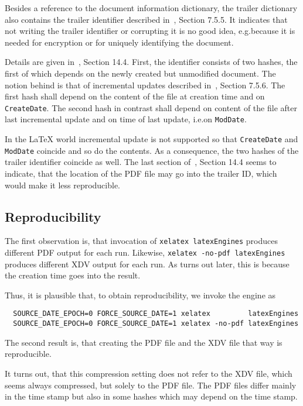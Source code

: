 \documentclass[a4paper, english]{article}%
\begin{document}
Besides a reference to the document information dictionary, 
the trailer dictionary also contains the trailer identifier 
described in~\cite{Pdf20}, Section 7.5.5. 
It indicates that not writing the trailer identifier or corrupting it is no good idea, 
e.g.\@ because it is needed for encryption or for uniquely identifying the document. 

Details are given in~\cite{Pdf20}, Section 14.4. 
First, the identifier consists of two hashes, 
the first of which depends on the newly created but unmodified document. 
The notion behind is that of incremental updates described in~\cite{Pdf20}, Section 7.5.6. 
The first hash shall depend on the content of the file 
at creation time and on \texttt{CreateDate}. 
The second hash in contrast shall depend on content of the file after last incremental update 
and on time of last update, i.e.\@ on \texttt{ModDate}. 

In the \LaTeX{} world incremental update is not supported 
so that \texttt{CreateDate} and \texttt{ModDate} coincide 
and so do the contents. 
As a consequence, the two hashes of the trailer identifier coincide as well. 
The last section of~\cite{Pdf20}, Section 14.4 seems to indicate, 
that the location of the PDF file may go into the trailer ID, 
which would make it less reproducible. 


\subsection{Reproducibility}\label{subsec:reprod}

The first observation is, that invocation of \texttt{xelatex latexEngines} 
produces different PDF output for each run. 
Likewise, \texttt{xelatex -no-pdf latexEngines} produces different XDV output for each run. 
As turns out later, this is because the creation time goes into the result. 

Thus, it is plausible that, to obtain reproducibility, we invoke the engine as 
%
\begin{verbatim}
  SOURCE_DATE_EPOCH=0 FORCE_SOURCE_DATE=1 xelatex         latexEngines
  SOURCE_DATE_EPOCH=0 FORCE_SOURCE_DATE=1 xelatex -no-pdf latexEngines
\end{verbatim}

The second result is, that creating the PDF file and the XDV file that way is reproducible. 




It turns out, that this compression setting does not refer to the XDV file, 
which seems always compressed, but solely to the PDF file. 
The PDF files differ mainly in the time stamp 
but also in some hashes which may depend on the time stamp. 
\end{document}
